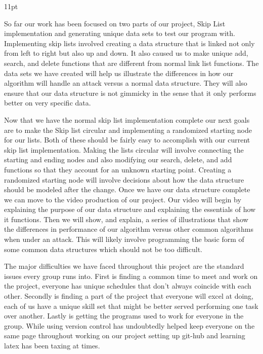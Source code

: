 \documentclass[11pt,twocolumn]{article}
\begin{document}
{11pt}

So far our work has been focused on two parts of our project, Skip List implementation and 
generating unique data sets to test our program with. Implementing skip lists involved 
creating a data structure that is linked not only from left to right but also up and down. 
It also caused us to make unique add, search, and delete functions that are different from 
normal link list functions. The data sets we have created will help us illustrate the 
differences in how our algorithm will handle an attack versus a normal data structure. 
They will also ensure that our data structure is not gimmicky in the sense that it only 
performs better on very specific data.

Now that we have the normal skip list implementation complete our next goals are to make 
the Skip list circular and implementing a randomized starting node for our lists. Both of 
these should be fairly easy to accomplish with our current skip list implementation. Making 
the lists circular will involve connecting the starting and ending nodes and also modifying 
our search, delete, and add functions so that they account for an unknown starting point. 
Creating a randomized starting node will involve decisions about how the data structure 
should be modeled after the change. Once we have our data structure complete we can move 
to the video production of our project. Our video will begin by explaining the purpose of 
our data structure and explaining the essentials of how it functions. Then we will show, 
and explain, a series of illustrations that show the differences in performance of our 
algorithm versus other common algorithms when under an attack. This will likely involve 
programming the basic form of some common data structures which should not be too 
difficult.

The major difficulties we have faced throughout this project are the standard issues every 
group runs into. First is finding a common time to meet and work on the project, everyone 
has unique schedules that don't always coincide with each other. Secondly is finding a 
part of the project that everyone will excel at doing, each of us have a unique skill set 
that might be better served performing one task over another. Lastly is getting the 
programs used to work for everyone in the group. While using version control has 
undoubtedly helped keep everyone on the same page throughout working on our project 
setting up git-hub and learning latex has been taxing at times.
\end{document}
